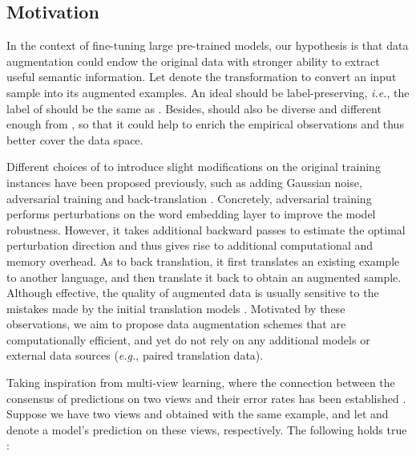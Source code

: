 \documentclass[11pt,a4paper]{article}
\begin{document}
\subsection{Motivation}
In the context of fine-tuning large pre-trained models, our hypothesis is that data augmentation could endow the original data with stronger ability to extract useful semantic information. Let  denote the transformation to convert an input sample  into its augmented examples. An ideal  should be label-preserving, \emph{i.e.}, the label of  should be the same as . Besides,  should also be diverse and different enough from , so that it could help to enrich the empirical observations and thus better cover the data space. 

Different choices of  to introduce slight modifications on the original training instances have been proposed previously, such as adding Gaussian noise, adversarial training \cite{liu2020adversarial, zhu2019freelb} and back-translation \cite{wei2018fast, xie2019unsupervised}. Concretely, adversarial training performs perturbations on the word embedding layer to improve the model robustness. 
However, it takes additional backward passes to estimate the optimal perturbation direction and thus gives rise to additional computational and memory overhead.
As to back translation, it first translates an existing example to another language, and then translate it back to obtain an augmented sample. 
Although effective, the quality of augmented data is usually sensitive to the mistakes made by the initial translation models \cite{chapelle2009semi, Wang2018SwitchOutAE}. Motivated by these observations, we aim to propose data augmentation schemes that are computationally efficient, and yet do not rely on any additional models or external data sources (\emph{e.g.}, paired translation data). 

Taking inspiration from multi-view learning, where the connection between the consensus of predictions on two views and their error rates has been established \cite{dasgupta2002pac}. Suppose we have two views  and  obtained with the same example, and let  and  denote a model's prediction on these views, respectively. The following holds true \cite{dasgupta2002pac}:
\end{document}
